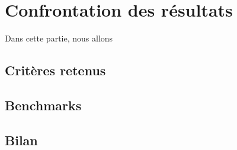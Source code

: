 \section{Confrontation des résultats}

Dans cette partie, nous allons 


\subsection{Critères retenus}
\subsection{Benchmarks}
\subsection{Bilan}

\pagebreak